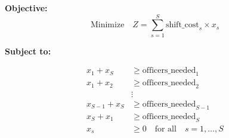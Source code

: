 \documentclass{article}
\begin{document}
\textbf{Objective:}
\[
\text{Minimize} \quad Z = \sum_{s=1}^{S} \text{shift\_cost}_s \times x_s
\]

\textbf{Subject to:}

\begin{align*}
x_1 + x_S & \geq \text{officers\_needed}_1 \\
x_1 + x_2 & \geq \text{officers\_needed}_2 \\
& \vdots \\
x_{S-1} + x_S & \geq \text{officers\_needed}_{S-1} \\
x_S + x_1 & \geq \text{officers\_needed}_S \\
x_s & \geq 0 \quad \text{for all} \quad s = 1, \ldots, S
\end{align*}
\end{document}
